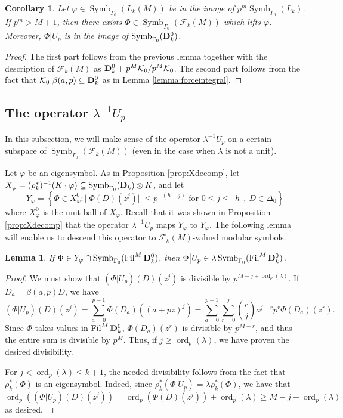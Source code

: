 \documentclass{amsart}
\theoremstyle{plain}
\newtheorem{lemma}[thm]{Lemma}
\newtheorem{cor}[thm]{Corollary}
\theoremstyle{definition}
\newcommand{\bD}{{\bf D}}
\newcommand{\F}{{\mathcal F}}
\newcommand{\K}{{\mathcal K}}
\newcommand{\bap}{\beta(a,p)}
\renewcommand{\binom}[2]{\genfrac{(}{)}{0pt}{}{#1}{#2}}
\renewcommand{\sp}{{\rho^*_k}}
\newcommand{\Dvrig}[1]{\bD_{#1}}
\newcommand{\Dkrig}{\Dvrig{k}}
\newcommand{\FkM}{\F_k(M)}
\DeclareMathOperator{\ord}{ord}
\DeclareMathOperator{\Symb}{Symb}
\DeclareMathOperator{\Fil}{Fil}
\newcommand{\MSo}[1]{\Symb_{\Gamma_0}(#1)}
\begin{document}
\begin{cor}
Let $\varphi \in \MSo{L_k(M)}$ be in the image of $p^m \MSo{L_k}$.  If $p^{m} > M+1$, then there exists $\Phi \in \MSo{\FkM}$ which lifts $\varphi$.  Moreover, $\Phi \big| U_p$ is in the image of $\MSo{\Dkrig^0}$.
\end{cor}

\begin{proof}
The first part follows from the previous lemma together with the description of $\FkM$ as $\Dkrig^0+p^M\K_0/p^M\K_0$. The second part follows from the fact that $\K_0 \big| \bap \subseteq \Dkrig^0$ as in Lemma \ref{lemma:forceintegral}.
\end{proof}

\subsection{The operator $\lambda^{-1} U_p$} 
\label{sec:iter}

In this subsection, we will make sense of the operator $\lambda^{-1} U_p$ on a certain subspace of $\MSo{\FkM}$ (even in the case when $\lambda$ is not a unit).

Let $\varphi$ be an eigensymbol. 
As in Proposition \ref{prop:Xdecomp}, let $X_\varphi = (\sp)^{-1} (K \cdot \varphi) \subseteq \MSo{\Dkrig} \otimes K$, and let 
$$
Y_\varphi = \left\{ \Phi \in X_\varphi^0 :   ||\Phi(D)(z^{j})|| \leq p^{-(h-j)} \text{~for~} 0 \leq j \leq \lfloor h \rfloor,~D \in \Delta_{0} \right\}
$$ 
where $X_\varphi^0$ is the unit ball of $X_\varphi$.  Recall that it was shown in Proposition \ref{prop:Xdecomp} that the operator $\lambda^{-1}U_p$ maps $Y_\varphi$ to $Y_\varphi$.  The following lemma will enable us to descend this operator to $\FkM$-valued modular symbols.  

\begin{lemma}
\label{lemma:des}
If $\Phi \in Y_\varphi \cap \MSo{\Fil^M \Dkrig^0}$, then $\Phi \big| U_p \in \lambda \MSo{\Fil^M \Dkrig^0}$.
\end{lemma}

\begin{proof}
We must show that $(\Phi | U_p)(D)(z^j)$ is divisible by $p^{M-j+\ord_p(\lambda)}$.  If $D_a = \bap D$, we have
\begin{equation}
\label{eqn:accuracy}
(\Phi | U_p)(D)(z^j)
= \sum_{a=0}^{p-1} \Phi(D_a)((a+pz)^j) 
= \sum_{a=0}^{p-1}  \sum_{r=0}^j \binom{r}{j} a^{j-r} p^r \Phi(D_a)(z^r).
\end{equation}
Since $\Phi$ takes values in $\Fil^M \Dkrig^0$, $\Phi(D_a)(z^r)$ is divisible by $p^{M-r}$, and thus the entire sum is divisible by $p^M$.  Thus, if $j \geq \ord_p(\lambda)$, we have proven the desired divisibility.

For $j < \ord_p(\lambda) \leq k+1$, the needed divisibility follows from the fact that $\sp(\Phi)$ is an eigensymbol.  Indeed, since $\sp(\Phi \big| U_p) = \lambda \sp(\Phi)$,  we have that 
$$
\ord_p((\Phi \big| U_p)(D)(z^j)) = \ord_p( \Phi(D)(z^j) ) + \ord_p(\lambda) \geq M-j + \ord_p(\lambda)
$$
as desired.
\end{proof}
\end{document}

